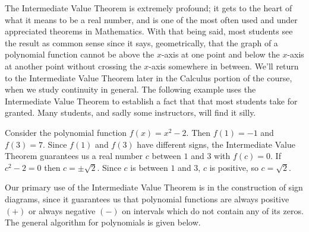 
\smallskip

The Intermediate Value Theorem is extremely profound;  it gets to the heart of what it means to be a real number, and is one of the most often used and under appreciated theorems in Mathematics.  With that being said, most students see the result as common sense since it says, geometrically, that the graph of a polynomial function cannot be above the $x$-axis at one point and below the $x$-axis at another point without crossing the $x$-axis somewhere in between. We'll return to the Intermediate Value Theorem later in the Calculus portion of the course, when we study continuity in general.  The following example uses the Intermediate Value Theorem to establish a fact that that most students take for granted.  Many students, and sadly some instructors, will find it silly.

\medskip


{Consider the polynomial function $f(x) = x^2 - 2$.  Then $f(1) = -1$ and $f(3) = 7$.  Since $f(1)$ and $f(3)$ have different signs, the Intermediate Value Theorem guarantees us a real number $c$ between $1$ and $3$ with $f(c) = 0$.  If $c^2 - 2 = 0$ then $c = \pm \sqrt{2}$.  Since $c$ is between $1$ and $3$, $c$ is positive, so $c = \sqrt{2}$.}

\medskip


Our primary use of the Intermediate Value Theorem is in the construction of sign diagrams,  since it guarantees us that polynomial functions are always positive $(+)$ or always negative $(-)$ on intervals which do not contain any of its zeros.  The general algorithm for polynomials is given below.

\smallskip


